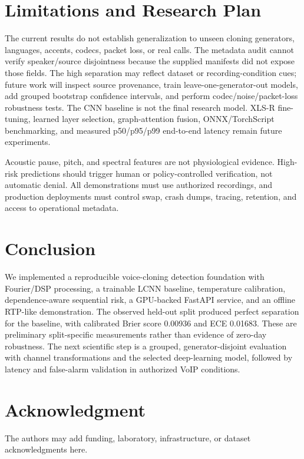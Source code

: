 \documentclass[journal]{IEEEtran}
\begin{document}
\section{Limitations and Research Plan}
The current results do not establish generalization to unseen cloning generators, languages, accents, codecs, packet loss, or real calls. The metadata audit cannot verify speaker/source disjointness because the supplied manifests did not expose those fields. The high separation may reflect dataset or recording-condition cues; future work will inspect source provenance, train leave-one-generator-out models, add grouped bootstrap confidence intervals, and perform codec/noise/packet-loss robustness tests. The CNN baseline is not the final research model. XLS-R fine-tuning, learned layer selection, graph-attention fusion, ONNX/TorchScript benchmarking, and measured p50/p95/p99 end-to-end latency remain future experiments.

Acoustic pause, pitch, and spectral features are not physiological evidence. High-risk predictions should trigger human or policy-controlled verification, not automatic denial. All demonstrations must use authorized recordings, and production deployments must control swap, crash dumps, tracing, retention, and access to operational metadata.

\section{Conclusion}
We implemented a reproducible voice-cloning detection foundation with Fourier/DSP processing, a trainable LCNN baseline, temperature calibration, dependence-aware sequential risk, a GPU-backed FastAPI service, and an offline RTP-like demonstration. The observed held-out split produced perfect separation for the baseline, with calibrated Brier score 0.00936 and ECE 0.01683. These are preliminary split-specific measurements rather than evidence of zero-day robustness. The next scientific step is a grouped, generator-disjoint evaluation with channel transformations and the selected deep-learning model, followed by latency and false-alarm validation in authorized VoIP conditions.

\section*{Acknowledgment}
The authors may add funding, laboratory, infrastructure, or dataset acknowledgments here.
\end{document}
